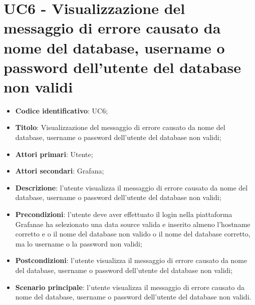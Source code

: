 \section{UC6 - Visualizzazione del messaggio di errore causato da nome del database, username o password dell'utente del database non             validi}
\begin{itemize}
    \item \textbf{Codice identificativo}: UC6;
    \item \textbf{Titolo}: Visualizzazione del messaggio di errore causato da nome del database, username o password dell'utente del                            database non validi;
    \item \textbf{Attori primari}: Utente;
    \item \textbf{Attori secondari}: Grafana\glo;
    \item \textbf{Descrizione}: l'utente visualizza il messaggio di errore causato da nome del database, username o password dell'utente                             del database non validi;
    \item \textbf{Precondizioni}: l'utente deve aver effettuato il login nella piattaforma Grafana\glo e ha selezionato una data source                                valida e inserito almeno l'hostname corretto e o il nome del database non valido o il nome del                                       database corretto, ma lo username o la password non validi;
    \item \textbf{Postcondizioni}: l'utente visualizza il messaggio di errore causato da nome del database, username o password                                         dell'utente del database                                non validi;
    \item \textbf{Scenario principale}: l'utente visualizza il messaggio di errore causato da nome del database, username o password                                         dell'utente del database non validi.
\end{itemize}
